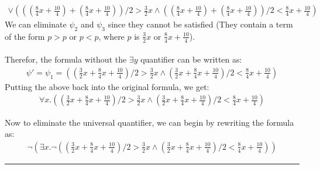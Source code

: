 \documentclass[12pt,letterpaper, onecolumn]{exam}
\begin{document}
\begin{questions}
\begin{align*}
				\lor (((\frac{8}{4}x + \frac{10}{4}) + (\frac{8}{4}x + \frac{10}{4})) / 2 > \frac{3}{2}x \land ((\frac{8}{4}x + \frac{10}{4}) + (\frac{8}{4}x + \frac{10}{4})) / 2 < \frac{8}{4}x + \frac{10}{4})
	\end{align*}
	We can eliminate $ \psi_2 $ and $ \psi_3 $ since they cannot be satisfied (They contain a term of the form $ p > p $ or $ p < p $, where $ p $ is $\frac{3}{2}x$ or $\frac{8}{4}x + \frac{10}{4}$). \\ \\
	Therefor, the formula without the $ \exists y $ quantifier can be written as:
	\begin{align*}
		\psi' = \psi_1
		      = ((\frac{3}{2}x + \frac{8}{4}x + \frac{10}{4}) / 2 > \frac{3}{2}x \land (\frac{3}{2}x + \frac{8}{4}x + \frac{10}{4}) / 2 < \frac{8}{4}x + \frac{10}{4})
	\end{align*}
	Putting the above back into the original formula, we get:
	\begin{align*}
		\forall x. ((\frac{3}{2}x + \frac{8}{4}x + \frac{10}{4}) / 2 > \frac{3}{2}x \land (\frac{3}{2}x + \frac{8}{4}x + \frac{10}{4}) / 2 < \frac{8}{4}x + \frac{10}{4})
	\end{align*}

	Now to eliminate the universal quantifier, we can begin by rewriting the formula as:
	\begin{align*}
		\neg (\exists x. \neg ((\frac{3}{2}x + \frac{8}{4}x + \frac{10}{4}) / 2 > \frac{3}{2}x \land (\frac{3}{2}x + \frac{8}{4}x + \frac{10}{4}) / 2 < \frac{8}{4}x + \frac{10}{4}))
	\end{align*}




    {\rule{17cm}{0.4pt}}

\end{questions}
\end{document}
